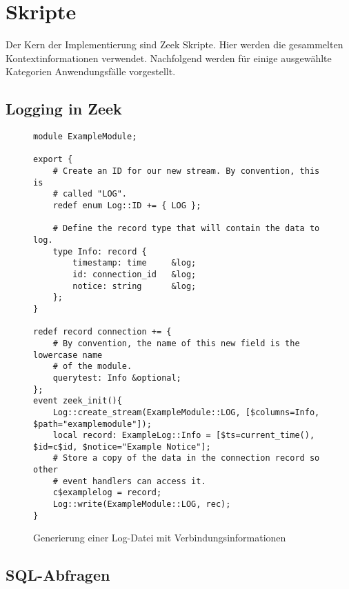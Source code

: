 \section{Skripte}
Der Kern der Implementierung sind Zeek Skripte. Hier werden die gesammelten Kontextinformationen verwendet. Nachfolgend werden für einige ausgewählte Kategorien Anwendungsfälle vorgestellt.
\subsection{Logging in Zeek}

\begin{figure}[h!]
\centering
\begin{lstlisting}
module ExampleModule;

export {
    # Create an ID for our new stream. By convention, this is
    # called "LOG".
    redef enum Log::ID += { LOG };

    # Define the record type that will contain the data to log.
    type Info: record {
        timestamp: time		&log;
        id: connection_id	&log; 
        notice: string		&log;
    };
}

redef record connection += {
    # By convention, the name of this new field is the lowercase name
    # of the module.
    querytest: Info &optional;
};
event zeek_init(){
	Log::create_stream(ExampleModule::LOG, [$columns=Info, $path="examplemodule"]);
	local record: ExampleLog::Info = [$ts=current_time(), $id=c$id, $notice="Example Notice"];
    # Store a copy of the data in the connection record so other
    # event handlers can access it.
    c$examplelog = record;
    Log::write(ExampleModule::LOG, rec);
}
\end{lstlisting}
\caption{Generierung einer Log-Datei mit Verbindungsinformationen}
\end{figure}
\subsection{SQL-Abfragen}
